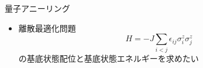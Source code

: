 \begin{frame}[t,fragile]{量子アニーリング}
  \begin{itemize}
  \item 離散最適化問題
    \[
    H = -J \sum_{i<j} \epsilon_{ij} \sigma_i^z \sigma_j^z
    \]
    の基底状態配位と基底状態エネルギーを求めたい
    \begin{center}
    \end{center}
  \end{itemize}
\end{frame}
